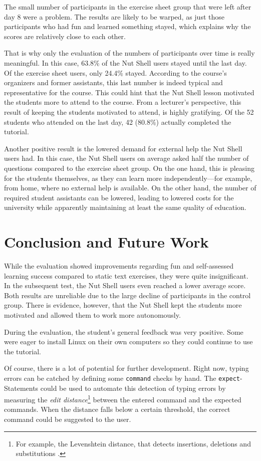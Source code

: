 \documentclass[paper=a4,twoside,abstract=on,cleardoublepage=empty,numbers=noenddot,toc=bib,toc=listof,12pt,appendixprefix=true]{scrreprt}
\begin{document}
The small number of participants in the exercise sheet group that were left after day 8 were a problem. The results are likely to be warped, as just those participants who had fun and learned something stayed, which explains why the scores are relatively close to each other.

That is why only the evaluation of the numbers of participants over time is really meaningful. In this case, 63.8\% of the Nut Shell users stayed until the last day. Of the exercise sheet users, only 24.4\% stayed. According to the course's organizers and former assistants, this last number is indeed typical and representative for the course. This could hint that the Nut Shell lesson motivated the students more to attend to the course. From a lecturer's perspective, this result of keeping the students motivated to attend, is highly gratifying. Of the 52 students who attended on the last day, 42 (80.8\%) actually completed the tutorial.

Another positive result is the lowered demand for external help the Nut Shell users had. In this case, the Nut Shell users on average asked half the number of questions compared to the exercise sheet group. On the one hand, this is pleasing for the students themselves, as they can learn more independently---for example, from home, where no external help is available. On the other hand, the number of required student assistants can be lowered, leading to lowered costs for the university while apparently maintaining at least the same quality of education.

\chapter{Conclusion and Future Work}

While the evaluation showed improvements regarding fun and self-assessed learning success compared to static text exercises, they were quite insignificant. In the subsequent test, the Nut Shell users even reached a lower average score. Both results are unreliable due to the large decline of participants in the control group. There is evidence, however, that the Nut Shell kept the students more motivated and allowed them to work more autonomously.

During the evaluation, the student's general feedback was very positive. Some were eager to install Linux on their own computers so they could continue to use the tutorial.

Of course, there is a lot of potential for further development. Right now, typing errors can be catched by defining some \texttt{command} checks by hand. The \texttt{expect}-Statements could be used to automate this detection of typing errors by measuring the \emph{edit distance}\footnote{For example, the Levenshtein distance, that detects insertions, deletions and substitutions \cite{levenshtein66}.} between the entered command and the expected commands. When the distance falls below a certain threshold, the correct command could be suggested to the user.
\end{document}
